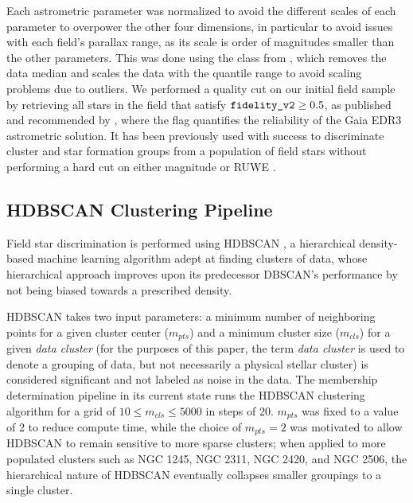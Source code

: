 Each astrometric parameter was normalized to avoid the different scales of each parameter to overpower the other four dimensions, in particular to avoid issues with each field's parallax range, as its scale is order of magnitudes smaller than the other parameters. This was done using the  class from  \autocite{pedregosaScikitlearnMachineLearning2011a}, which removes the data median and scales the data with the quantile range to avoid scaling problems due to outliers. We performed a quality cut on our initial field sample by retrieving all stars in the field that satisfy $\texttt{fidelity\_v2} \geq 0.5$, as published and recommended by \cite{rybizkiClassifierSpuriousAstrometric2022}, where the  flag quantifies the reliability of the Gaia EDR3 astrometric solution. It has been previously used with success to discriminate cluster and star formation groups from a population of field stars without performing a hard cut on either magnitude or RUWE \autocite{huntImprovingOpenCluster2023a,rottensteinerComprehensiveClusterCensus2026}. 

\subsection{HDBSCAN Clustering Pipeline}

Field star discrimination is performed using HDBSCAN \autocite{campelloDensityBasedClusteringBased2013}, a hierarchical density-based machine learning algorithm adept at finding clusters of data, whose hierarchical approach improves upon its predecessor DBSCAN's performance by not being biased towards a prescribed density. 

HDBSCAN takes two input parameters: a minimum number of neighboring points for a given cluster center ($m_{pts}$) and a minimum cluster size ($m_{cls}$) for a given \textit{data cluster} (for the purposes of this paper, the term \textit{data cluster} is used to denote a grouping of data, but not necessarily a physical stellar cluster) is considered significant and not labeled as noise in the data. The membership determination pipeline in its current state runs the HDBSCAN clustering algorithm for a grid of $10 \leq m_{cls} \leq 5000$ in steps of 20. $m_{pts}$ was fixed to a value of 2 to reduce compute time, while the choice of $m_{pts} = 2$ was motivated to allow HDBSCAN to remain sensitive to more sparse clusters; when applied to more populated clusters such as NGC 1245, NGC 2311, NGC 2420, and NGC 2506, the hierarchical nature of HDBSCAN eventually collapses smaller groupings to a single cluster. 

